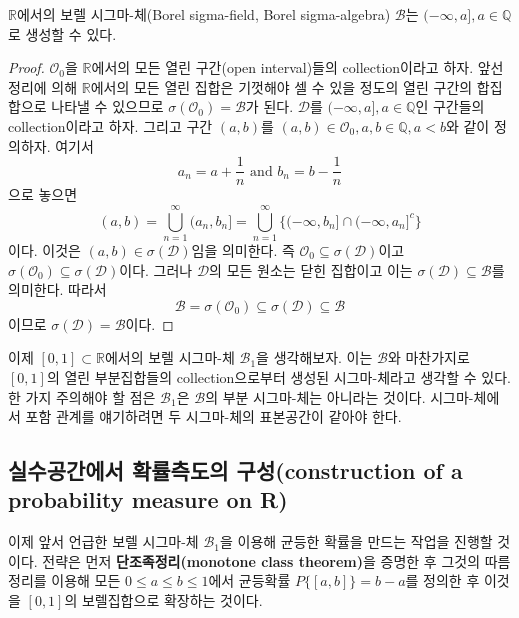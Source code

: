 \documentclass[b5paper,]{scrbook}
\theoremstyle{plain}
\theoremstyle{definition}
\numberwithin{equation}{section}
\let\BeginKnitrBlock\begin \let\EndKnitrBlock\end
\begin{document}
\BeginKnitrBlock{theorem}[실수 구간에서의 보렐 시그마-체의 생성]
\protect\hypertarget{thm:unnamed-chunk-59}{}{\label{thm:unnamed-chunk-59}
{}
}\(\mathbb{R}\)에서의 보렐 시그마-체(Borel sigma-field, Borel
sigma-algebra) \(\mathcal{B}\)는 \((-\infty, a], a\in\mathbb{Q}\)로
생성할 수 있다.
\EndKnitrBlock{theorem}

\BeginKnitrBlock{proof}
{}\(\mathcal{O}_{0}\)을 \(\mathbb{R}\)에서의
모든 열린 구간(open interval)들의 collection이라고 하자. 앞선 정리에
의해 \(\mathbb{R}\)에서의 모든 열린 집합은 기껏해야 셀 수 있을 정도의
열린 구간의 합집합으로 나타낼 수 있으므로
\(\sigma(\mathcal{O}_{0})=\mathcal{B}\)가 된다. \(\mathcal{D}\)를
\((-\infty, a], a\in \mathbb{Q}\)인 구간들의 collection이라고 하자.
그리고 구간 \((a,b)\)를
\((a,b)\in \mathcal{O}_{0}, a,b \in \mathbb{Q}, a<b\)와 같이 정의하자.
여기서 \[a_{n}=a+\frac{1}{n} \text{ and } b_{n}=b-\frac{1}{n}\] 으로
놓으면
\[(a,b)=\bigcup_{n=1}^{\infty}(a_{n},b_{n}]=\bigcup_{n=1}^{\infty}\{ (-\infty, b_{n}] \cap (-\infty, a_{n}]^{c}\}\]
이다. 이것은 \((a,b)\in \sigma (\mathcal{D})\)임을 의미한다. 즉
\(\mathcal{O}_{0}\subseteq \sigma(\mathcal{D})\)이고
\(\sigma(\mathcal{O}_{0})\subseteq \sigma(\mathcal{D})\)이다. 그러나
\(\mathcal{D}\)의 모든 원소는 닫힌 집합이고 이는
\(\sigma(\mathcal{D})\subseteq \mathcal{B}\)를 의미한다. 따라서
\[\mathcal{B} = \sigma(\mathcal{O}_{0})\subseteq \sigma(\mathcal{D})\subseteq \mathcal{B}\]
이므로 \(\sigma(\mathcal{D})=\mathcal{B}\)이다.
\EndKnitrBlock{proof}

이제 \([0,1]\subset \mathbb{R}\)에서의 보렐 시그마-체
\(\mathcal{B}_{1}\)을 생각해보자. 이는 \(\mathcal{B}\)와 마찬가지로
\([0,1]\)의 열린 부분집합들의 collection으로부터 생성된 시그마-체라고
생각할 수 있다. 한 가지 주의해야 할 점은 \(\mathcal{B}_{1}\)은
\(\mathcal{B}\)의 부분 시그마-체는 아니라는 것이다. 시그마-체에서 포함
관계를 얘기하려면 두 시그마-체의 표본공간이 같아야 한다.

\subsection{실수공간에서 확률측도의 구성(construction of a probability
measure on R)}\label{--construction-of-a-probability-measure-on-r}

이제 앞서 언급한 보렐 시그마-체 \(\mathcal{B}_{1}\)을 이용해 균등한
확률을 만드는 작업을 진행할 것이다. 전략은 먼저
\textbf{단조족정리(monotone class theorem)}을 증명한 후 그것의
따름정리를 이용해 모든 \(0\leq a \leq b \leq 1\)에서 균등확률
\(P\{[a,b]\}=b-a\)를 정의한 후 이것을 \([0,1]\)의 보렐집합으로 확장하는
것이다.
\end{document}
